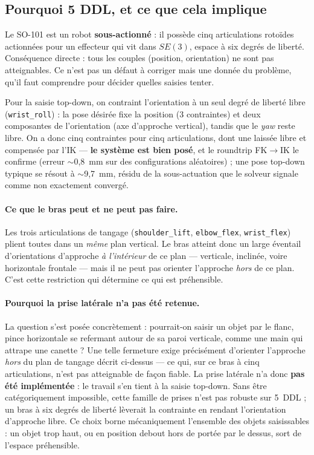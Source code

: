 \subsection{Pourquoi 5 DDL, et ce que cela implique}

Le SO-101 est un robot \textbf{sous-actionné} : il possède cinq articulations
rotoïdes actionnées pour un effecteur qui vit dans $SE(3)$, espace à six degrés de
liberté. Conséquence directe : tous les couples (position, orientation) ne sont
pas atteignables. Ce n'est pas un défaut à corriger mais une donnée du problème,
qu'il faut comprendre pour décider quelles saisies tenter.

Pour la saisie top-down, on contraint l'orientation à un seul degré de liberté
libre (\texttt{wrist\_roll}) : la pose désirée fixe la position (3 contraintes) et
deux composantes de l'orientation (axe d'approche vertical), tandis que le
\emph{yaw} reste libre. On a donc cinq contraintes pour cinq articulations, dont
une laissée libre et compensée par l'IK --- \textbf{le système est bien posé}, et
le roundtrip FK$\rightarrow$IK le confirme (erreur $\sim$0{,}8~mm sur des
configurations aléatoires) ; une pose top-down typique se résout à $\sim$9{,}7~mm,
résidu de la sous-actuation que le solveur signale comme non exactement convergé.

\paragraph{Ce que le bras peut et ne peut pas faire.}
Les trois articulations de tangage (\texttt{shoulder\_lift}, \texttt{elbow\_flex},
\texttt{wrist\_flex}) plient toutes dans un \emph{même} plan vertical. Le bras
atteint donc un large éventail d'orientations d'approche \emph{à l'intérieur} de
ce plan --- verticale, inclinée, voire horizontale frontale --- mais il ne peut
pas orienter l'approche \emph{hors} de ce plan. C'est cette restriction qui
détermine ce qui est préhensible.

\paragraph{Pourquoi la prise latérale n'a pas été retenue.}
La question s'est posée concrètement : pourrait-on saisir un objet par le flanc,
pince horizontale se refermant autour de sa paroi verticale, comme une main qui
attrape une canette ? Une telle fermeture exige précisément d'orienter l'approche
\emph{hors} du plan de tangage décrit ci-dessus --- ce qui, sur ce bras à cinq
articulations, n'est pas atteignable de façon fiable. La prise latérale n'a donc
\textbf{pas été implémentée} : le travail s'en tient à la saisie top-down. Sans
être catégoriquement impossible, cette famille de prises n'est pas robuste sur
5~DDL ; un bras à six degrés de liberté lèverait la contrainte en rendant
l'orientation d'approche libre. Ce choix borne mécaniquement l'ensemble des objets
saisissables : un objet trop haut, ou en position debout hors de portée par le
dessus, sort de l'espace préhensible.

